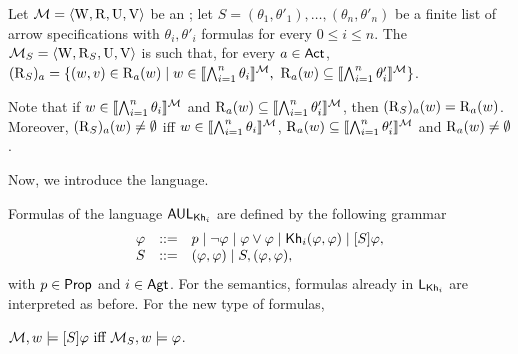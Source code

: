 \medskip 

\begin{definition}
Let $\mathcal{M} = \langle \operatorname{W}, \operatorname{R}, \operatorname{U}, \operatorname{V} \rangle$ be an \ults; let $S = (\theta_1,\theta'_1),\dots,(\theta_n,\theta'_n)$ be a finite list of arrow specifications with $\theta_i,\theta'_i$ formulas for every $0\leq i \leq n$. The \ults $\mathcal{M}_{{S}} = \langle \operatorname{W}, \operatorname{R}_{{S}}, \operatorname{U},\operatorname{V} \rangle$ is such that, for every $a\in{\rm \sf Act}$,
	$(\operatorname{R}_{{S}})_a = \{ (w,v) \in \operatorname{R}_a(w) \mid w \in \llbracket \bigwedge_{i=1}^n \theta_i \rrbracket^{\mathcal{M}} \text{, } \operatorname{R}_a(w) \subseteq \llbracket \bigwedge_{i=1}^n \theta'_i \rrbracket^{\mathcal{M}} \}$.
\end{definition}


Note that if $w \in \llbracket \bigwedge_{i=1}^n \theta_i \rrbracket^{\mathcal{M}}$ and $\operatorname{R}_a(w) \subseteq \llbracket \bigwedge_{i=1}^n \theta'_i \rrbracket^{\mathcal{M}}$, then $(\operatorname{R}_{{S}})_a(w) = \operatorname{R}_a(w)$. Moreover, $(\operatorname{R}_{{S}})_a(w) \neq \emptyset$ iff $w \in \llbracket \bigwedge_{i=1}^n \theta_i \rrbracket^{\mathcal{M}}$, $\operatorname{R}_a(w) \subseteq \llbracket \bigwedge_{i=1}^n \theta'_i \rrbracket^{\mathcal{M}}$ and $\operatorname{R}_a(w) \neq \emptyset$.

\medskip

Now, we introduce the language.

\medskip

\begin{definition}\label{def:arrowsyntax}\label{def:arrowupdate}
Formulas of the language $\mathsf{AUL}_{{\sf Kh}_i}$ are defined by the following grammar
\[
\begin{array}{lcl}
\varphi & ::= & p \mid \neg\varphi \mid \varphi\vee\varphi \mid
{\sf Kh}_i(\varphi,\varphi) \mid [S]\varphi, \\
S & ::= & (\varphi,\varphi) \mid S,(\varphi,\varphi),
\end{array}
\]
with $p \in {\rm \sf Prop}$ and $i\in{\rm \sf Agt}$. 
For the semantics, formulas already in $\mathsf{L}_{{\sf Kh}_i}$ are interpreted as before. For the new type of formulas, 
\begin{spcenter}
	$\mathcal{M},w \models [S]\varphi \mbox{ iff } \mathcal{M}_{{S}},w \models \varphi$.
\end{spcenter}
\end{definition}

